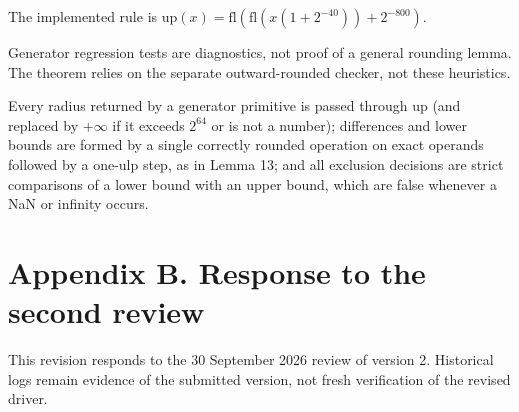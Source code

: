 \documentclass[
  11pt,
]{article}
\begin{document}
The implemented rule is
\(\mathrm{up}(x)=\mathrm{fl}(\mathrm{fl}(x(1+2^{-40}))+2^{-800})\).

Generator regression tests are diagnostics, not proof of a general
rounding lemma. The theorem relies on the separate outward-rounded
checker, not these heuristics.

Every radius returned by a generator primitive is passed through
\(\mathrm{up}\) (and replaced by \(+\infty\) if it exceeds \(2^{64}\) or
is not a number); differences and lower bounds are formed by a single
correctly rounded operation on exact operands followed by a one-ulp
step, as in Lemma 13; and all exclusion decisions are strict comparisons
of a lower bound with an upper bound, which are false whenever a NaN or
infinity occurs.

\section{Appendix B. Response to the second
review}\label{appendix-b.-response-to-the-second-review}

This revision responds to the 30 September 2026 review of version 2.
Historical logs remain evidence of the submitted version, not fresh
verification of the revised driver.
\end{document}
